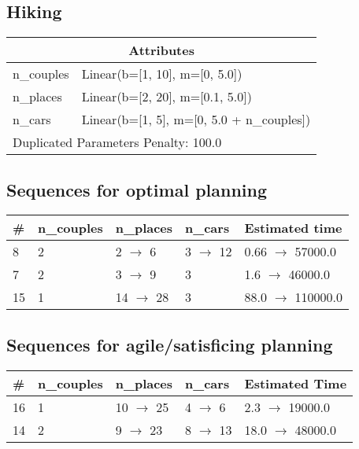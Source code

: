 \documentclass{article}
\begin{document}
                            \newpage \subsection{Hiking}
                    \begin{center}
                    \begin{tabular}{@{}p{}p{}@{}}
                    \multicolumn{2}{c}{\bf \large Attributes}\\\midrule
                    n\_couples & Linear(b=[1, 10], m=[0, 5.0])\\
n\_places & Linear(b=[2, 20], m=[0.1, 5.0])\\
n\_cars & Linear(b=[1, 5], m=[0, 5.0 + n\_couples]) \\\midrule
                    \multicolumn{2}{l}{Duplicated Parameters Penalty: 100.0}
                    \end{tabular}
                    \end{center}
                
                            \subsection*{Sequences for optimal planning}

                            \begin{center}
                            \begin{tabular}{@{}l|l|l|l|l@{}}
                            \# & n\_couples & n\_places & n\_cars & Estimated time\\\midrule
                            8&2&2 $\rightarrow$ 6&3 $\rightarrow$ 12&0.66 $\rightarrow$ 57000.0\\
7&2&3 $\rightarrow$ 9&3&1.6 $\rightarrow$ 46000.0\\
15&1&14 $\rightarrow$ 28&3&88.0 $\rightarrow$ 110000.0
                            \end{tabular}
                            \end{center}
                    
                         \subsection*{Sequences for agile/satisficing planning}

                        \begin{center}
                        \begin{tabular}{@{}l|l|l|l|l@{}}
                        \# & n\_couples & n\_places & n\_cars & Estimated Time\\\midrule
                        16&1&10 $\rightarrow$ 25&4 $\rightarrow$ 6&2.3 $\rightarrow$ 19000.0\\
14&2&9 $\rightarrow$ 23&8 $\rightarrow$ 13&18.0 $\rightarrow$ 48000.0
                        \end{tabular}
                        \end{center}
                    
\end{document}
